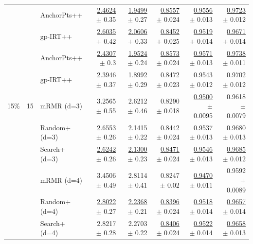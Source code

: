 \begin{longtable}{llp{}rrrrr}
 &  & AnchorPts++ & \underline{2.4624} {\scriptsize $\pm$ 0.35} & \underline{1.9499} {\scriptsize $\pm$ 0.27} & \underline{0.8557} {\scriptsize $\pm$ 0.024} & \underline{0.9556} {\scriptsize $\pm$ 0.013} & \underline{0.9723} {\scriptsize $\pm$ 0.012} \\
 &  & gp-IRT++ & \underline{2.6035} {\scriptsize $\pm$ 0.42} & \underline{2.0606} {\scriptsize $\pm$ 0.33} & \underline{0.8452} {\scriptsize $\pm$ 0.025} & \underline{0.9519} {\scriptsize $\pm$ 0.014} & \underline{0.9671} {\scriptsize $\pm$ 0.014} \\
 &  & AnchorPts++ & \underline{2.4307} {\scriptsize $\pm$ 0.3} & \underline{1.9524} {\scriptsize $\pm$ 0.24} & \underline{0.8573} {\scriptsize $\pm$ 0.024} & \underline{0.9571} {\scriptsize $\pm$ 0.013} & \underline{0.9738} {\scriptsize $\pm$ 0.011} \\
 &  & gp-IRT++ & \underline{2.3946} {\scriptsize $\pm$ 0.37} & \underline{1.8992} {\scriptsize $\pm$ 0.29} & \underline{0.8472} {\scriptsize $\pm$ 0.023} & \underline{0.9543} {\scriptsize $\pm$ 0.012} & \underline{0.9702} {\scriptsize $\pm$ 0.012} \\
\midrule
15\% & 15 & mRMR (d=3) & 3.2565 {\scriptsize $\pm$ 0.55} & 2.6212 {\scriptsize $\pm$ 0.46} & 0.8290 {\scriptsize $\pm$ 0.018} & \underline{0.9500} {\scriptsize $\pm$ 0.0095} & 0.9618 {\scriptsize $\pm$ 0.0079} \\
 &  & Random+ (d=3) & \underline{2.6553} {\scriptsize $\pm$ 0.26} & \underline{2.1415} {\scriptsize $\pm$ 0.22} & \underline{0.8442} {\scriptsize $\pm$ 0.024} & \underline{0.9537} {\scriptsize $\pm$ 0.013} & \underline{0.9680} {\scriptsize $\pm$ 0.013} \\
 &  & Search+ (d=3) & \underline{2.6242} {\scriptsize $\pm$ 0.26} & \underline{2.1300} {\scriptsize $\pm$ 0.23} & \underline{0.8471} {\scriptsize $\pm$ 0.024} & \underline{0.9546} {\scriptsize $\pm$ 0.013} & \underline{0.9685} {\scriptsize $\pm$ 0.012} \\
 &  & mRMR (d=4) & 3.4506 {\scriptsize $\pm$ 0.49} & 2.8114 {\scriptsize $\pm$ 0.41} & 0.8247 {\scriptsize $\pm$ 0.02} & \underline{0.9470} {\scriptsize $\pm$ 0.011} & 0.9592 {\scriptsize $\pm$ 0.0089} \\
 &  & Random+ (d=4) & \underline{2.8022} {\scriptsize $\pm$ 0.27} & \underline{2.2368} {\scriptsize $\pm$ 0.21} & \underline{0.8396} {\scriptsize $\pm$ 0.024} & \underline{0.9518} {\scriptsize $\pm$ 0.014} & \underline{0.9657} {\scriptsize $\pm$ 0.014} \\
 &  & Search+ (d=4) & 2.8217 {\scriptsize $\pm$ 0.28} & 2.2703 {\scriptsize $\pm$ 0.22} & \underline{0.8406} {\scriptsize $\pm$ 0.024} & \underline{0.9522} {\scriptsize $\pm$ 0.014} & \underline{0.9658} {\scriptsize $\pm$ 0.013} \\

\end{longtable}
